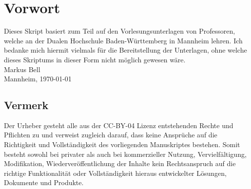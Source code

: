 \chapter*{Vorwort}

Dieses Skript basiert zum Teil auf den Vorlesungsunterlagen von Professoren, welche an der Dualen Hochschule Baden-Württemberg in Mannheim lehren. Ich bedanke mich hiermit vielmals für die Bereitstellung der Unterlagen, ohne welche dieses Skriptums in dieser Form nicht möglich gewesen wäre.\\

Markus Bell\\

Mannheim, \today

\section*{Vermerk}

Der Urheber gesteht alle aus der CC-BY-04 Lizenz entstehenden Rechte und Pflichten zu und verweist zugleich darauf, dass keine Ansprüche auf die Richtigkeit und Vollständigkeit des vorliegenden Manuskriptes bestehen. Somit besteht sowohl bei privater als auch bei kommerzieller Nutzung, Vervielfältigung, Modifikation, Wiederveröffentlichung der Inhalte kein Rechtsanspruch auf die richtige Funktionalität oder Vollständigkeit hieraus entwickelter Lösungen, Dokumente und Produkte.